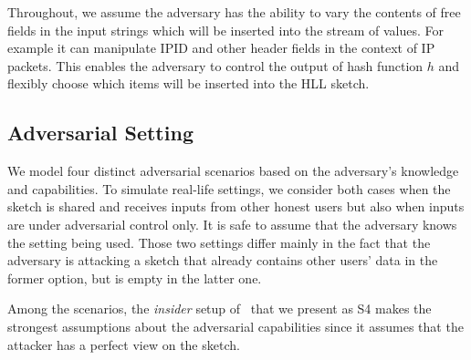 \documentclass[11pt]{article}
\begin{document}
Throughout, we assume the adversary has the ability to vary the contents of free fields in the input strings which will be inserted into the stream of values. For example it can manipulate IPID and other header fields in the context of IP packets. This enables the adversary to control the output of hash function $h$ and flexibly choose which items will be inserted into the HLL sketch.

\subsection{Adversarial Setting}\label{sec:set}
We model four distinct adversarial scenarios based on the adversary's knowledge and capabilities. To simulate real-life settings, we consider both cases when the sketch is shared and receives inputs from other honest users but also when inputs are under adversarial control only.
It is safe to assume that the adversary knows the setting being used. 
Those two settings differ mainly in the fact that the adversary is attacking a sketch that already contains other users' data in the former option, but is empty in the latter one.

Among the scenarios, the \textit{insider} setup of~\cite{cardestprivacy} that we present as S4 makes the strongest assumptions about the adversarial capabilities since it assumes that the attacker has a perfect view on the sketch.
\end{document}

